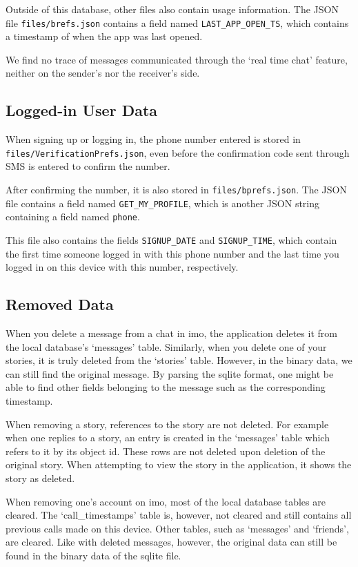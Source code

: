\documentclass[conference]{IEEEtran}
\begin{document}
Outside of this database, other files also contain usage information. The JSON
file \texttt{files/brefs.json} contains a field named
\texttt{LAST\_APP\_OPEN\_TS}, which contains a timestamp of when the app was
last opened.

We find no trace of messages communicated through the `real time chat' feature,
neither on the sender's nor the receiver's side.


\subsection{Logged-in User Data}

When signing up or logging in, the phone number entered is stored in
\texttt{files/VerificationPrefs.json}, even before the confirmation code sent
through SMS is entered to confirm the number.

After confirming the number, it is also stored in \texttt{files/bprefs.json}.
The JSON file contains a field named \texttt{GET\_MY\_PROFILE}, which is another
JSON string containing a field named \texttt{phone}.

This file also contains the fields \texttt{SIGNUP\_DATE} and
\texttt{SIGNUP\_TIME}, which contain the first time someone logged in with this
phone number and the last time you logged in on this device with this number,
respectively.


\subsection{Removed Data}

When you delete a message from a chat in imo, the application deletes it from
the local database's `messages' table. Similarly, when you delete one of your
stories, it is truly deleted from the `stories' table. However, in the binary
data, we can still find the original message. By parsing the sqlite format, one
might be able to find other fields belonging to the message such as the
corresponding timestamp.

When removing a story, references to the story are not deleted. For example
when one replies to a story, an entry is created in the `messages' table which
refers to it by its object id. These rows are not deleted upon deletion of the
original story. When attempting to view the story in the application, it shows
the story as deleted.

When removing one's account on imo, most of the local database tables are
cleared. The `call\_timestamps' table is, however, not cleared and still
contains all previous calls made on this device. Other tables, such as
`messages' and `friends', are cleared. Like with deleted messages, however, the
original data can still be found in the binary data of the sqlite file.
\end{document}
